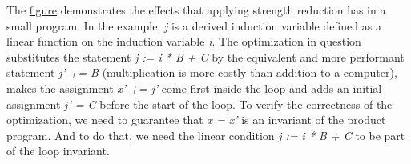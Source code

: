 The \hyperref[fig:induction_var_strength_red]{figure} demonstrates the effects that applying strength reduction has in a small program.
In the example, \emph{j} is a derived induction variable defined as a linear function on the induction variable \emph{i}.
The optimization in question substitutes the statement \emph{j := i * B + C} by the equivalent and more performant statement \emph{j' += B} (multiplication is more costly than addition to a computer), makes the assignment \emph{x' += j'} come first inside the loop and adds an initial assignment \emph{j' = C} before the start of the loop.
To verify the correctness of the optimization, we need to guarantee that \emph{x = x'} is an invariant of the product program.
And to do that, we need the linear condition \emph{j := i * B + C} to be part of the loop invariant.
